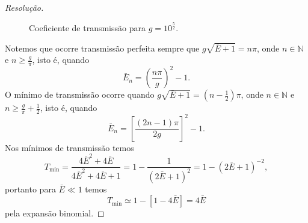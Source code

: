 \begin{proof}[Resolução]
    \begin{figure}[!ht]
        \centering
        \caption{Coeficiente de transmissão para \(g = 10^{\frac52}.\)}
    \end{figure}

    Notemos que ocorre transmissão perfeita sempre que \(g\sqrt{\bar{E} + 1} = n\pi\), onde \(n \in \mathbb{N}\) e \(n \geq \frac{g}{\pi}\), isto é, quando
    \begin{equation*}
        \bar{E}_n = \left(\frac{n\pi}{g}\right)^2 - 1.
    \end{equation*}
    O mínimo de transmissão ocorre quando \(g \sqrt{\bar{E} + 1} = (n - \frac{1}{2})\pi\), onde \(n \in \mathbb{N}\) e \(n \geq \frac{g}{\pi} + \frac12\), isto é, quando
    \begin{equation*}
        \bar{E}_n = \left[\frac{(2n - 1)\pi}{2g}\right]^2 - 1.
    \end{equation*}
    Nos mínimos de transmissão temos
    \begin{equation*}
        T_\mathrm{min} = \frac{4\bar{E}^2 + 4\bar{E}}{4\bar{E}^2 + 4\bar{E} + 1} = 1 - \frac{1}{(2\bar{E} + 1)^2} = 1 - (2\bar{E} + 1)^{-2},
    \end{equation*}
    portanto para \(\bar{E} \ll 1\) temos
    \begin{equation*}
        T_\mathrm{min} \simeq 1 - \left[1 - 4\bar{E}\right] = 4\bar{E}
    \end{equation*}
    pela expansão binomial.
\end{proof}
